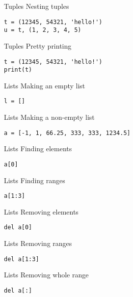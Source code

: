 \documentclass{beamer}
\begin{document}
\begin{frame}[fragile]{Tuples}
Nesting tuples
\begin{lstlisting}
t = (12345, 54321, 'hello!')
u = t, (1, 2, 3, 4, 5)
\end{lstlisting}
\end{frame}

\begin{frame}[fragile]{Tuples}
Pretty printing
\begin{lstlisting}
t = (12345, 54321, 'hello!')
print(t)
\end{lstlisting}
\end{frame}

\begin{frame}[fragile]{Lists}
Making an empty list
\begin{lstlisting}
l = []
\end{lstlisting}
\end{frame}

\begin{frame}[fragile]{Lists}
Making a non-empty list
\begin{lstlisting}
a = [-1, 1, 66.25, 333, 333, 1234.5]
\end{lstlisting}
\end{frame}

\begin{frame}[fragile]{Lists}
Finding elements
\begin{lstlisting}
a[0]
\end{lstlisting}
\end{frame}

\begin{frame}[fragile]{Lists}
Finding ranges
\begin{lstlisting}
a[1:3]
\end{lstlisting}
\end{frame}

\begin{frame}[fragile]{Lists}
Removing elements
\begin{lstlisting}
del a[0]
\end{lstlisting}
\end{frame}

\begin{frame}[fragile]{Lists}
Removing ranges
\begin{lstlisting}
del a[1:3]
\end{lstlisting}
\end{frame}

\begin{frame}[fragile]{Lists}
Removing whole range
\begin{lstlisting}
del a[:]
\end{lstlisting}
\end{frame}
\end{document}
